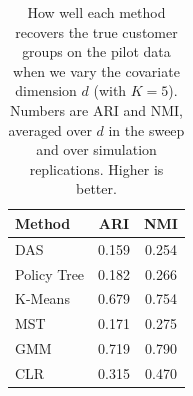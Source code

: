 \begin{table}[htbp]
\centering
\caption{How well each method recovers the true customer groups on the pilot data when we vary the covariate dimension $d$ (with $K=5$). Numbers are ARI and NMI, averaged over $d$ in the sweep and over simulation replications. Higher is better.}
\label{tab:app-ari-nmi-varying-d-avg}
\begin{tabular}{lcc}
\toprule
Method & ARI & NMI \\
\midrule
DAS & 0.159 & 0.254 \\
Policy Tree & 0.182 & 0.266 \\
K-Means & 0.679 & 0.754 \\
MST & 0.171 & 0.275 \\
GMM & 0.719 & 0.790 \\
CLR & 0.315 & 0.470 \\
\bottomrule
\end{tabular}
\end{table}
